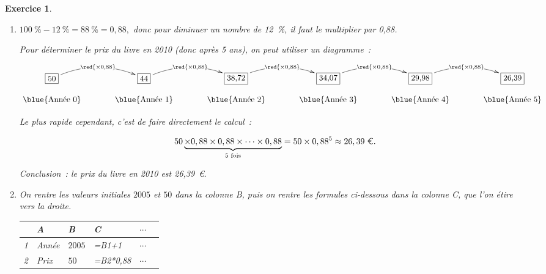 \documentclass[10pt]{article}
\newtheorem{exo}{Exercice}
\begin{document}
\begin{exo}

\begin{enumerate}
\item $100~\%-12~\%=88~\%=0,88,$ donc pour diminuer un nombre de 12~\%, il faut le multiplier par 0,88. 


\medskip

Pour déterminer le prix du livre en 2010 (donc après 5 ans), on peut utiliser un diagramme~:


\begin{center}
$\xymatrix@R=0.5pc@C=3pc{
    *+[F]+\txt{50} \ar@/^0.5cm/[r]|{\red{\times 0,88}} & 
    *+[F]+\txt{44} \ar@/^0.5cm/[r]|{\red{\times 0,88}} & *+[F]+\txt{38,72} \ar@/^0.5cm/[r]|{\red{\times 0,88}} & *+[F]+\txt{34,07}\ar@/^0.5cm/[r]|{\red{\times 0,88}} & *+[F]+\txt{29,98}\ar@/^0.5cm/[r]|{\red{\times 0,88}} & *+[F]+\txt{26,39}\\
    \txt{\blue{\text{Année 0}}}&
    \txt{\blue{\text{Année 1}}}&\txt{\blue{\text{Année 2}}}&\txt{\blue{\text{Année 3}}}&\txt{\blue{\text{Année 4}}}&\txt{\blue{\text{Année 5}}}
    }$
    
    \end{center}
    

\medskip

Le plus rapide cependant, c'est de faire directement le calcul~:


\[50\underbrace{\times 0,88\times 0,88\times \cdots\times 0,88}_{\text{5 fois}}=50\times 0,88^{5}\approx 26,39~\text{\euro}.\]

Conclusion~: le prix du livre en 2010 est 26,39~\euro.

\item On rentre les valeurs initiales $2005$ et $50$ dans la colonne B, puis on rentre les formules ci-dessous dans la colonne C, que l'on étire vers la droite.

\medskip

\begin{center}
\begin{tabularx}{\linewidth}{|c|*{5}{>{\centering \arraybackslash}X|}}\hline
	&A   	&B		&C			&$\cdots$   	\\ \hline   
1 & Année &$2005$  	&=B1+1				&$\cdots$ \\ \hline   
2 & Prix &$50$   		&=B2*0,88		&$\cdots$  \\ \hline    
\end{tabularx}
\end{center}

\medskip


\end{enumerate}
\end{exo}
\end{document}
